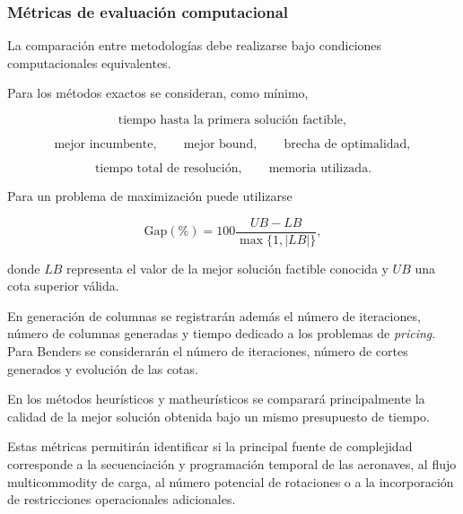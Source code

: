 \subsubsection{Métricas de evaluación computacional}
\label{app:metricas}

La comparación entre metodologías debe realizarse bajo condiciones computacionales
equivalentes.

Para los métodos exactos se consideran, como mínimo,

\[
\text{tiempo hasta la primera solución factible},
\]

\[
\text{mejor incumbente},
\qquad
\text{mejor bound},
\qquad
\text{brecha de optimalidad},
\]

\[
\text{tiempo total de resolución},
\qquad
\text{memoria utilizada}.
\]

Para un problema de maximización puede utilizarse

\begin{equation}
\mathrm{Gap}(\%)
=
100
\frac{UB-LB}
{\max\{1,|LB|\}},
\label{eq:gap}
\end{equation}

donde $LB$ representa el valor de la mejor solución factible conocida y $UB$ una cota
superior válida.

En generación de columnas se registrarán además el número de iteraciones, número de columnas
generadas y tiempo dedicado a los problemas de \textit{pricing}. Para Benders se considerarán
el número de iteraciones, número de cortes generados y evolución de las cotas.

En los métodos heurísticos y matheurísticos se comparará principalmente la calidad de la mejor
solución obtenida bajo un mismo presupuesto de tiempo.

Estas métricas permitirán identificar si la principal fuente de complejidad corresponde a la
secuenciación y programación temporal de las aeronaves, al flujo multicommodity de carga, al
número potencial de rotaciones o a la incorporación de restricciones operacionales
adicionales.